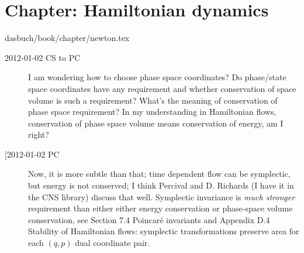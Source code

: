 \section{Chapter: Hamiltonian dynamics}
\label{c-newton}\noindent dasbuch/book/chapter/newton.tex
\begin{description}

\item[2012-01-02 CS to PC]
I am wondering how to choose phase space
coordinates? Do phase/state space coordinates have any requirement and
whether conservation of space volume is such a requirement? What's the
meaning of conservation of phase space requirement? In my understanding
in Hamiltonian flows, conservation of phase space volume means
conservation of energy, am I right?

\item[[2012-01-02 PC]
Now, it is more subtle than that; time dependent flow can be symplectic,
but energy is not conserved; I think Percival and D.
Richards (I have it in the
 {CNS library})
discuss that well. Symplectic invariance is \emph{much stronger}
requirement than either either energy conservation or phase-space volume
conservation, see 
{Section 7.4 Poincar\'e invariants} and
 {Appendix D.4
Stability of Hamiltonian flows}: symplectic transformations preserve area
for each $(q,p)$ dual coordinate  pair.

\end{description}


%
%

